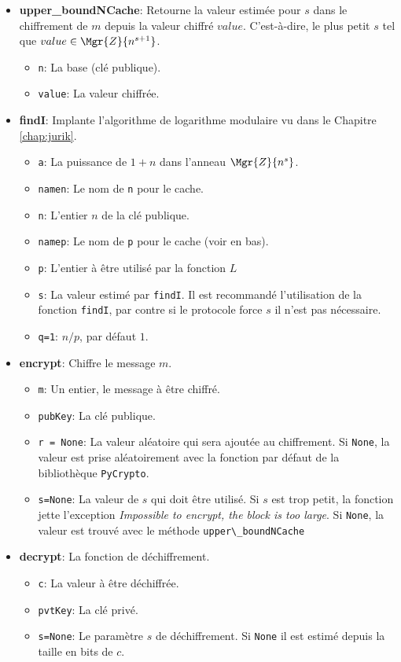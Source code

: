 \begin{itemize}
		\item \textbf{upper\_boundNCache}: Retourne la valeur estimée pour $s$ dans le chiffrement  de 
		$m$ depuis la valeur chiffré $value$. C'est-à-dire, le plus petit $s$ tel que $value \in \Mgr{Z}{n^{s+1}}$.
			\begin{itemize}
				\item \verb!n!: La base (clé publique).
				\item \verb!value!: La valeur chiffrée.
			\end{itemize}
		\item \textbf{findI}: Implante l'algorithme de logarithme modulaire vu dans le Chapitre \ref{chap:jurik}.
			\begin{itemize}
				\item \verb!a!: La puissance de $1+n$ dans l'anneau $\Mgr{Z}{n^{s}}$.
				\item \verb!namen!: Le nom de \verb!n! pour le cache.
				\item \verb!n!:  L'entier $n$ de la clé publique.
				\item \verb!namep!: Le nom de \verb!p! pour le cache (voir en bas).
				\item \verb!p!: L'entier à être utilisé par la fonction $L$
				\item \verb!s!: La valeur estimé par \verb!findI!. Il est recommandé l'utilisation de la fonction \verb!findI!, par contre si le protocole force $s$ il n'est pas nécessaire.
				\item \verb!q=1!: $n/p$, par défaut $1$.
			\end{itemize}
		\item \textbf{encrypt}: Chiffre le message $m$.
			\begin{itemize}
				\item \verb!m!: Un entier, le message à être chiffré.
				\item \verb!pubKey!: La clé publique.
				\item \verb!r = None!: La valeur aléatoire qui 
				sera ajoutée au chiffrement. Si \verb!None!, 
				la va\-leur est prise aléatoirement avec
				la fonction par défaut de la bibliothèque
				\verb!PyCrypto!.
				\item \verb!s=None!: La valeur de $s$ qui 
				doit être utilisé. Si $s$ est trop petit, 
				la fonction jette l'exception 	{\em Impossible 
				to encrypt, the block is too large}. Si \verb!None!, 
				la valeur est trouvé avec le méthode \verb!upper\_boundNCache!
			\end{itemize}
	
		\item \textbf{decrypt}: La fonction de déchiffrement.
			\begin{itemize}
				\item \verb!c!: La valeur à être déchiffrée.
				\item \verb!pvtKey!: La clé privé.
				\item \verb!s=None!: Le paramètre $s$ de déchiffrement. Si \verb!None! il est estimé depuis la taille en bits de $c$.
			\end{itemize}
	\end{itemize}


